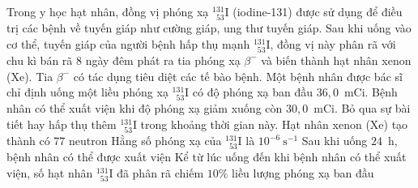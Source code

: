 	\begin{ex}%
		Trong y học hạt nhân, đồng vị phóng xạ ${}^{131}_{\phantom{1}53}\text{I}$ (iodine-131) được sử dụng để điều trị các bệnh về tuyến giáp như cường giáp, ung thư tuyến giáp. Sau khi uống vào cơ thể, tuyến giáp của người bệnh hấp thụ mạnh ${}^{131}_{\phantom{1}53}\text{I}$, đồng vị này phân rã với chu kì bán rã $8$ ngày đêm phát ra tia phóng xạ $\beta^-$ và biến thành hạt nhân xenon (Xe). Tia $\beta^-$ có tác dụng tiêu diệt các tế bào bệnh. Một bệnh nhân được bác sĩ chỉ định uống một liều phóng xạ ${}^{131}_{\phantom{1}53}\text{I}$ có độ phóng xạ ban đầu $36{,}0$~mCi. Bệnh nhân có thể xuất viện khi độ phóng xạ giảm xuống còn $30{,}0$~mCi. Bỏ qua sự bài tiết hay hấp thụ thêm ${}^{131}_{\phantom{1}53}\text{I}$ trong khoảng thời gian này.
		\choiceTFt
		{\True Hạt nhân xenon (Xe) tạo thành có $77$ neutron}
		{\True Hằng số phóng xạ của ${}^{131}_{\phantom{1}53}\text{I}$ là $10^{-6}~\text{s}^{-1}$}
		{Sau khi uống $24$~h, bệnh nhân có thể được xuất viện}
		{Kể từ lúc uống đến khi bệnh nhân có thể xuất viện, số hạt nhân ${}^{131}_{\phantom{1}53}\text{I}$ đã phân rã chiếm $10\%$ liều lượng phóng xạ ban đầu}
	\end{ex}


